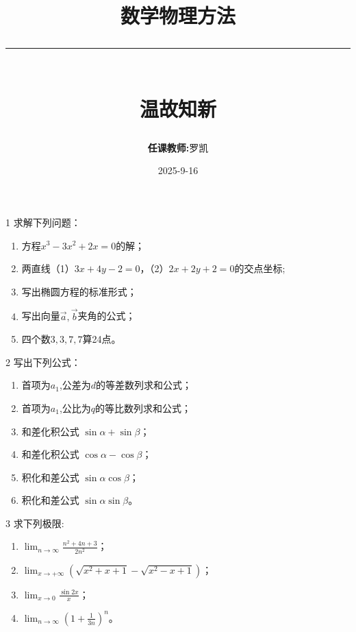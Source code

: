 \documentclass[11pt]{article}
\title{
    \vspace{-1.5cm}
    {\Huge\color{headercolor}\textbf{数学物理方法}}\\
    \vspace{0.3cm}
    {\color{accentcolor}\rule{8cm}{1pt}}\\
    \vspace{0.3cm}
    {\Large\color{sectioncolor}温故知新}
}
\author{
    \begin{tabular}{rl}
        \textbf{\color{sectioncolor}任课教师:} & 罗凯\\[0.2cm]
    \end{tabular}
}
\date{2025-9-16}
\begin{document}
\maketitle


\begin{hwproblem}{1}
求解下列问题：
\begin{enumerate}
  \item 方程$x^3 -3x^2 + 2x = 0 $的解；
  \item 两直线（1）$3 x+4 y-2=0$，（2）$2 x+2 y+2 = 0$的交点坐标;
  \item 写出椭圆方程的标准形式；
  \item 写出向量$\vec{a},\vec{b}$夹角的公式；
  \item 四个数$3,3,7,7$算24点。
\end{enumerate}
\end{hwproblem}

\vspace{0.5cm}

\begin{hwproblem}{2}
  写出下列公式：
  \begin{enumerate}
    \item 首项为$a_1$,公差为$d$的等差数列求和公式；
    \item 首项为$a_1$,公比为$q$的等比数列求和公式；
    \item 和差化积公式 $\sin \alpha + \sin \beta$；
    \item 和差化积公式 $\cos \alpha - \cos \beta$；
    \item 积化和差公式 $\sin\alpha \cos\beta$；
    \item 积化和差公式 $\sin\alpha \sin \beta$。
  \end{enumerate}
\end{hwproblem}

\vspace{0.5cm}

\begin{hwproblem}{3}
  求下列极限:
  \begin{enumerate}
    \item $\lim _{n \rightarrow \infty} \frac{n^2+4 n+3}{2 n^2}$；
    \item $\lim _{x \rightarrow+\infty}\left(\sqrt{x^2+x+1}-\sqrt{x^2-x+1}\right)$；
    \item $\lim _{x \rightarrow 0} \frac{\sin 2 x }{x} $；
    \item $\lim _{n \rightarrow \infty}\left(1+\frac{1}{3n}\right)^n$。
  \end{enumerate}  
\end{hwproblem}
\end{document}
